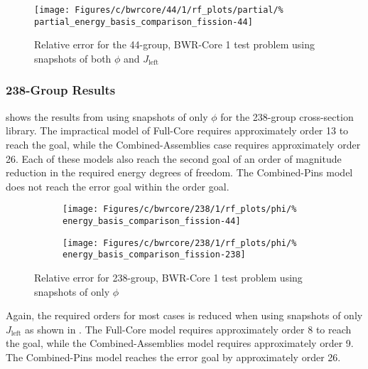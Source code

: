 \begin{figure*}[tb]
    \centering
    \texttt{[image: Figures/c/bwrcore/44/1/rf\_plots/partial/\%
        partial\_energy\_basis\_comparison\_fission-44]}
    \caption{Relative error for the 44-group, BWR-Core 1 test problem using 
        snapshots of both $\phi$ and $J_{\text{left}}$}
    \label{fig:BWR1_combined}
\end{figure*}

\subsubsection{238-Group Results}

 shows the results from using snapshots of only 
$\phi$ for the 238-group cross-section library.  The impractical model of 
Full-Core requires approximately order 13 to reach the goal, while the 
Combined-Assemblies case requires approximately order 26.  Each of these models 
also 
reach the second goal of an order of magnitude reduction in the required energy 
degrees of freedom.  The Combined-Pins model does not reach the error goal 
within the order goal.  

\begin{figure*}[tb]
    \centering
    \begin{subfigure}{0.5\textwidth}
        \centering
    \texttt{[image: Figures/c/bwrcore/238/1/rf\_plots/phi/\%
        energy\_basis\_comparison\_fission-44]}
    \end{subfigure}%
    \begin{subfigure}{0.5\textwidth}
        \centering
    \texttt{[image: Figures/c/bwrcore/238/1/rf\_plots/phi/\%
        energy\_basis\_comparison\_fission-238]}
    \end{subfigure}
    \caption{Relative error for 238-group, BWR-Core 1 test problem using 
        snapshots of only $\phi$}
    \label{fig:BWR1_phi-238}
\end{figure*}

Again, the required orders for most cases is reduced when using snapshots of 
only $J_{\text{left}}$ as shown in .  
The Full-Core model requires approximately order 8 to reach the goal, while the 
Combined-Assemblies model requires approximately order 9.  The Combined-Pins 
model  reaches the error goal by approximately order 26.

